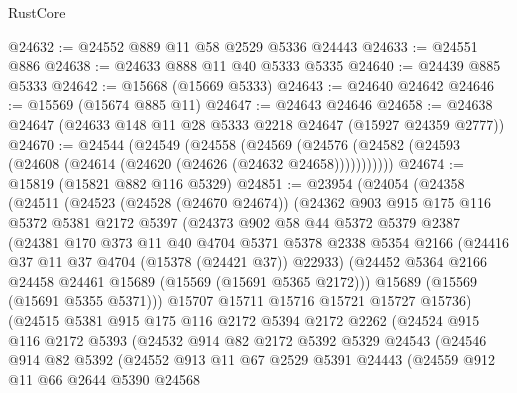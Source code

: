\begin{lexlean}{RustCore}
\begin{coremodule}
@24632 := @24552 @889 @11 @58 @2529 @5336 @24443
@24633 := @24551 @886
@24638 := @24633 @888 @11 @40 @5333 @5335
@24640 := @24439 @885 @5333
@24642 := @15668 (@15669 @5333)
@24643 := @24640 @24642
@24646 := @15569 (@15674 @885 @11)
@24647 := @24643 @24646
@24658 := @24638 @24647 (@24633 @148 @11 @28 @5333 @2218 @24647 (@15927 @24359 @2777))
@24670 := @24544
    (@24549
      (@24558
        (@24569 (@24576 (@24582 (@24593 (@24608 (@24614 (@24620 (@24626 (@24632 @24658)))))))))))
@24674 := @15819 (@15821 @882 @116 @5329)
@24851 := @23954
    (@24054
      (@24358
        (@24511
          (@24523
            (@24528 (@24670 @24674))
            (@24362
              @903
              @915
              @175
              @116
              @5372
              @5381
              @2172
              @5397
              (@24373
                @902
                @58
                @44
                @5372
                @5379
                @2387
                (@24381
                  @170
                  @373
                  @11
                  @40
                  @4704
                  @5371
                  @5378
                  @2338
                  @5354
                  @2166
                  (@24416 @37 @11 @37 @4704 (@15378 (@24421 @37)) @22933)
                  (@24452 @5364 @2166 @24458 @24461 @15689 (@15569 (@15691 @5365 @2172)))
                  @15689
                  (@15569 (@15691 @5355 @5371)))
                @15707
                @15711
                @15716
                @15721
                @15727
                @15736)
              (@24515
                @5381
                @915
                @175
                @116
                @2172
                @5394
                @2172
                @2262
                (@24524
                  @915
                  @116
                  @2172
                  @5393
                  (@24532
                    @914
                    @82
                    @2172
                    @5392
                    @5329
                    @24543
                    (@24546
                      @914
                      @82
                      @5392
                      (@24552
                        @913
                        @11
                        @67
                        @2529
                        @5391
                        @24443
                        (@24559
                          @912
                          @11
                          @66
                          @2644
                          @5390
                          @24568

\end{coremodule}
\end{lexlean}
